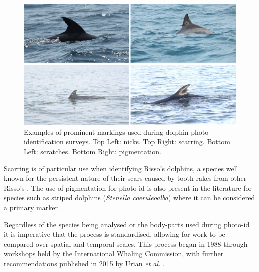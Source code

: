 \begin{figure}
	\begin{center}
		\includegraphics[scale=0.6]{Chapter2/figs/nicks-scarring-scratching-pigmentation.png}
	\end{center}
	\caption{Examples of prominent markings used during dolphin photo-identification surveys. Top Left: nicks. Top Right: scarring. Bottom Left: scratches. Bottom Right: pigmentation.
	}
	\label{fig:nicks-scarring-scratching-pigmentation}
\end{figure}

Scarring is of particular use when identifying Risso's dolphins, a species well known for the persistent nature of their scars caused by tooth rakes from other Risso's \cite{mariani_analysis_2016}. The use of pigmentation for photo-id is also present in the literature for species such as striped dolphins (\textit{Stenella coeruleoalba}) where it can be considered a primary marker \cite{rosso_colour_2008}.

Regardless of the species being analysed or the body-parts used during photo-id it is imperative that the process is standardised, allowing for work to be compared over spatial and temporal scales. This process began in 1988 through workshops held by the International Whaling Commission, with further recommendations published in 2015 by Urian \textit{et al.} \cite{hammond_individual_1990, urian_recommendations_2015}. 

